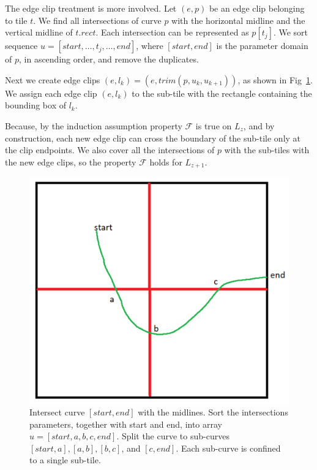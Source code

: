 \documentclass{gd-llncs}
\begin{document}
{The edge clip treatment is more involved. Let $(e, p)$ be an edge clip belonging to tile $t$. We find all intersections of curve $p$ with the horizontal midline and the vertical midline of $t.\textit{rect}$. Each intersection can be represented as $p[t_j]$. We sort sequence $u =[start, \dots, t_j, \dots, end]$, where $[start,end]$ is the parameter domain of $p$, in ascending order, and remove the duplicates.

Next we create edge clips $(e, l_k)=(e, \textit{trim}(p, u_k, u_{k+1}))$, as shown in Fig~\ref{fig:clip}. We assign each edge clip $(e,l_k)$ to the sub-tile with the rectangle containing the bounding box of $l_k$.

Because, by the induction assumption property $\mathcal{F}$ is true on $L_z$, and by construction, each new edge clip can cross the boundary of the sub-tile only at the clip endpoints. We also cover all the intersections of $p$ with the sub-tiles with the new edge clips, so the property $\mathcal{F}$ holds for $L_{z+1}$.
\begin{figure}[!tbp]
  \centering
  \includegraphics[width=\textwidth/2]{./edge_clips.png}
  \caption{Intersect curve $[\textit{start},\textit{end}]$ with the midlines.
  Sort the intersections parameters, together with start and end, into array $u = [\textit{start}, a,b,c, \textit{end}]$. 
  Split the curve to sub-curves $[\textit{start},a], [a,b],[b,c]$, and $[c,\textit{end}]$. Each sub-curve is confined to a single sub-tile.}
  \label{fig:clip}
\end{figure}

}
\end{document}
